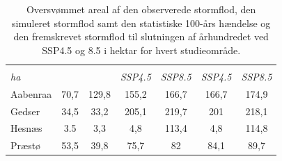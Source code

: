 \begin{table}[H]
\centering
\renewcommand{\arraystretch}{1.2} 
\begin{threeparttable}
\caption{Oversvømmet areal af den observerede stormflod, den simuleret stormflod samt den statistiske 100-års hændelse og den fremskrevet stormflod til slutningen af århundredet ved SSP4.5 og 8.5 i hektar for hvert studieområde.}
    \begin{tabular}{@{} l S[table-format=3.1, output-decimal-marker={,}] 
                        S[table-format=3.1, output-decimal-marker={,}] 
                        S[table-format=3.1, output-decimal-marker={,}] 
                        S[table-format=3.1, output-decimal-marker={,}] 
                        S[table-format=3.1, output-decimal-marker={,}] 
                        S[table-format=3.1, output-decimal-marker={,}] @{}} 
    \toprule
    &  
    &  
    &  
    &  \\ 
    \cmidrule(l){4-5} \cmidrule(l){6-7}
    {\textit{ha}} & & & {\textit{SSP4.5}} & {\textit{SSP8.5}} & {\textit{SSP4.5}} & {\textit{SSP8.5}} \\
    \midrule
      Aabenraa & 70,7 & 129,8 & 155,2 & 166,7 & 166,7 & 174,9 \\
      Gedser & 34,5 & 33,2 & 205,1 & 219,7 & 201 & 218,1 \\ 
      Hesnæs & 3.5 & 3,3 & 4,8 & 113,4 & 4,8 & 114,8 \\
      Præstø & 53,5 & 39,8 & 75,7 & 82 & 84,1 & 89,7 \\
    \bottomrule
    \end{tabular}
\label{Tabel: Oversvømmet arealer af stormfloder}
\end{threeparttable}
\end{table}


